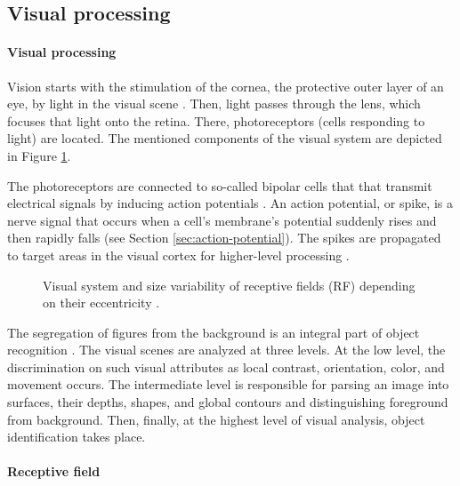 \subsection{Visual processing}

\paragraph{Visual processing}

Vision starts with the stimulation of the cornea, the protective outer layer of an eye, by light in the visual scene \cite{KandelBook2003:26}. Then, light passes through the lens, which focuses that light onto the retina. There, photoreceptors (cells responding to light) are located. The mentioned components of the visual system are depicted in Figure \ref{fig:receptive-field}. 

The photoreceptors are connected to so-called bipolar cells that that transmit electrical signals by inducing action potentials \cite{IzhikevichBook2004:2}. An action potential, or spike, is a nerve signal that occurs when a cell's membrane's potential suddenly rises and then rapidly falls (see Section \ref{sec:action-potential}). The spikes are propagated to target areas in the visual cortex for higher-level processing \cite{KandelBook2003:26}.

\begin{figure}[!htp]
    \centering
    
    \caption{Visual system and size variability of receptive fields (RF) depending on their eccentricity \cite{KandelBook2003:25}.}
    \label{fig:receptive-field}
\end{figure}

The segregation of figures from the background is an integral part of object recognition \cite{KandelBook2003:25}. The visual scenes are analyzed at three levels. At the low level, the discrimination on such visual attributes as local contrast, orientation, color, and movement occurs. The intermediate level is responsible for parsing an image into surfaces, their depths, shapes, and global contours and distinguishing foreground from background. Then, finally, at the highest level of visual analysis, object identification takes place.


\paragraph{Receptive field}

